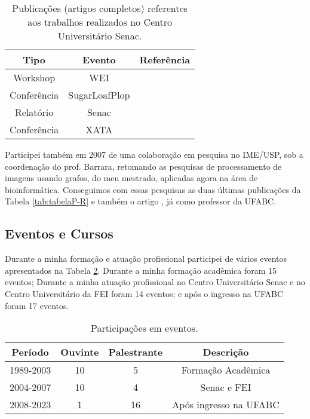 \begin{table}[!ht]
   \centering
   \caption{Publicações (artigos completos) referentes aos trabalhos realizados no Centro Universitário Senac.}\label{tab:tabelaP-C}
\begin{tabular}{|c|c|c|}
\hline
\textbf{Tipo} & \textbf{Evento} & \textbf{Referência} \\ \hline
  Workshop & WEI &  \cite{yamamoto2005interdisciplinaridade} \\ \hline
Conferência & SugarLoafPlop &  \cite{zampirolli2005algoritmos} \\ \hline
  Relatório & Senac &  \cite{zampirolli2003independent} \\ \hline
  Conferência & XATA &  \cite{zampirolli2006independent} \\ \hline 
\end{tabular}
\end{table}


Participei também em 2007 de uma colaboração em pesquisa no IME/USP, sob a coordenação do prof. Barrara, retomando as pesquisas de processamento de imagens usando grafos, do meu mestrado, aplicadas agora na área de bioinformática. Conseguimos com essas pesquisas as duas últimas publicações da Tabela \ref{tab:tabelaP-R} e também o artigo , já como professor da UFABC.

\subsection{Eventos e Cursos}

Durante a minha formação e atuação profissional participei de vários eventos apresentados na Tabela \ref{tab:tabelaEventos}. Durante a minha formação acadêmica foram 15 eventos; Durante a minha atuação profissional no Centro Universitário Senac e no Centro Universitário da FEI foram 14 eventos; e após o ingresso na UFABC foram 17 eventos.

\begin{table}[!ht]
   \centering
   \caption{Participações em eventos.}\label{tab:tabelaEventos}
\begin{tabular}{|c|c|c|c|}
\hline
\textbf{Período} & \textbf{Ouvinte} & \textbf{Palestrante} & \textbf{Descrição} \\ \hline
  1989-2003 & 10 &  5 & Formação Acadêmica \\ \hline
  2004-2007 & 10 &  4 & Senac e FEI \\ \hline
  2008-2023 & 1 &  16 & Após ingresso na UFABC\\ \hline
\end{tabular}
\end{table}

